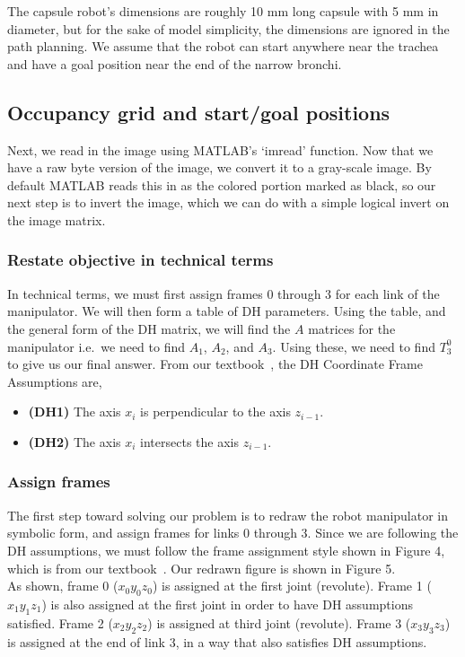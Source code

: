 \documentclass[conference]{IEEEtran}
\begin{document}
The capsule robot's dimensions are roughly 10 mm long capsule with 5 mm in diameter,
but for the sake of model simplicity, the dimensions are ignored in the
path planning. We assume that the robot can start anywhere near the trachea
and have a goal position near the end of the narrow bronchi.

\subsection{Occupancy grid and start/goal positions}

Next, we read in the image using MATLAB's `imread' function. Now
that we have a raw byte version of the image, we convert it to
a gray-scale image. By default MATLAB reads this in as the colored
portion marked as black, so our next step is to invert the image,
which we can do with a simple logical invert on the image matrix.



\subsubsection{Restate objective in technical terms}
In technical terms, we must first assign frames 0 through 3 for
each link of the manipulator. We will then form a table of DH
parameters. Using the table, and the general form of the DH matrix,
we will find the $A$ matrices for the manipulator i.e.\ we need to find
$A_1$, $A_2$, and $A_3$. Using these, we need to find $T^0_3$
to give us our final answer. From our textbook~\cite{Spong2006}, the 
DH Coordinate Frame Assumptions are,
\begin{itemize}
    \item \textbf{(DH1)} The axis $x_i$ is perpendicular to the axis $z_{i-1}$.
    \item \textbf{(DH2)} The axis $x_i$ intersects the axis $z_{i-1}$.
\end{itemize}
\vspace{0.1in}

\vspace{0.1in}
\subsubsection{Assign frames}
The first step toward solving our problem is to redraw the robot
manipulator in symbolic
form, and assign frames for links 0 through 3. Since we are following the DH assumptions,
we must follow the frame assignment style shown in Figure 4, which
is from our textbook~\cite{Spong2006}. Our redrawn figure is shown in Figure 5.\\
As shown, frame 0 ($x_0 y_0 z_0$) is assigned at the first joint (revolute). Frame 1
($x_1 y_1 z_1$) is also assigned at the
first joint in order to have DH assumptions satisfied. Frame 2 ($x_2 y_2 z_2$)
 is assigned at third joint (revolute). Frame 3 ($x_3 y_3 z_3$) is assigned at
the end of link 3, in a way that also satisfies DH assumptions.\\
\end{document}
